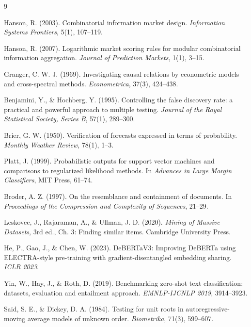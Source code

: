 \documentclass[11pt]{article}
\begin{document}
\clearpage
{}
{}
\begin{thebibliography}{9}

Hanson, R. (2003). Combinatorial information market design.
\emph{Information Systems Frontiers}, 5(1), 107--119.

Hanson, R. (2007). Logarithmic market scoring rules for modular combinatorial
information aggregation. \emph{Journal of Prediction Markets}, 1(1), 3--15.

Granger, C. W. J. (1969). Investigating causal relations by econometric models
and cross-spectral methods. \emph{Econometrica}, 37(3), 424--438.

Benjamini, Y., \& Hochberg, Y. (1995). Controlling the false discovery rate: a
practical and powerful approach to multiple testing. \emph{Journal of the Royal
Statistical Society, Series B}, 57(1), 289--300.

Brier, G. W. (1950). Verification of forecasts expressed in terms of
probability. \emph{Monthly Weather Review}, 78(1), 1--3.

Platt, J. (1999). Probabilistic outputs for support vector machines and
comparisons to regularized likelihood methods. In \emph{Advances in Large Margin
Classifiers}, MIT Press, 61--74.

Broder, A. Z. (1997). On the resemblance and containment of documents. In
\emph{Proceedings of the Compression and Complexity of Sequences}, 21--29.

Leskovec, J., Rajaraman, A., \& Ullman, J. D. (2020).
\emph{Mining of Massive Datasets}, 3rd ed., Ch. 3: Finding similar items.
Cambridge University Press.

He, P., Gao, J., \& Chen, W. (2023). DeBERTaV3: Improving DeBERTa using
ELECTRA-style pre-training with gradient-disentangled embedding sharing.
\emph{ICLR 2023}.

Yin, W., Hay, J., \& Roth, D. (2019). Benchmarking zero-shot text
classification: datasets, evaluation and entailment approach.
\emph{EMNLP-IJCNLP 2019}, 3914--3923.

Said, S. E., \& Dickey, D. A. (1984). Testing for unit roots in
autoregressive-moving average models of unknown order. \emph{Biometrika}, 71(3),
599--607.

\end{thebibliography}
\end{document}
